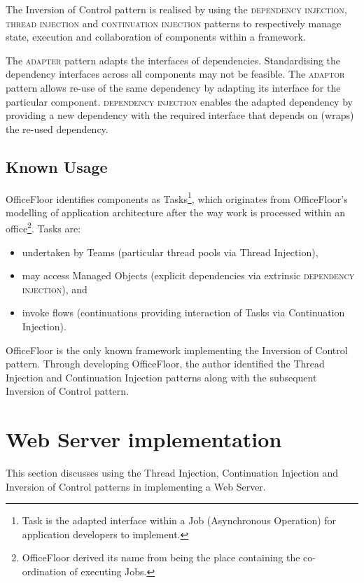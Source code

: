 \documentclass[prodmode]{style/acmlarge}
\begin{document}
The Inversion of Control pattern is realised by using the \textsc{dependency
injection}, \textsc{thread injection} and \textsc{continuation injection}
patterns to respectively manage state, execution and collaboration of components
within a framework.

The \textsc{adapter} pattern \cite{gof} adapts the interfaces of dependencies.
Standardising the dependency interfaces across all components may not be
feasible.  The \textsc{adaptor} pattern allows re-use of the same dependency by
adapting its interface for the particular component.  \textsc{dependency
injection} enables the adapted dependency by providing a new dependency with the
required interface that depends on (wraps) the re-used dependency.


\subsection{Known Usage}

OfficeFloor \cite{officefloor} identifies components as Tasks\footnote{Task is
the adapted interface within a Job (Asynchronous Operation) for application
developers to implement.}, which originates from OfficeFloor's modelling of
application architecture after the way work is processed within an
office\footnote{OfficeFloor derived its name from being the place containing the
co-ordination of executing Jobs.}.  Tasks are:
\begin{itemize}
  \item undertaken by Teams (particular thread pools via Thread Injection),
  \item may access Managed Objects (explicit dependencies via extrinsic \textsc{dependency injection}), and
  \item invoke flows (continuations providing interaction of Tasks via Continuation Injection).
\end{itemize}

OfficeFloor is the only known framework implementing the Inversion of Control
pattern.  Through developing OfficeFloor, the author identified the Thread
Injection and Continuation Injection patterns along with the subsequent
Inversion of Control pattern.



\section{Web Server implementation}

This section discusses using the Thread Injection, Continuation Injection and
Inversion of Control patterns in implementing a Web Server.
\end{document}
